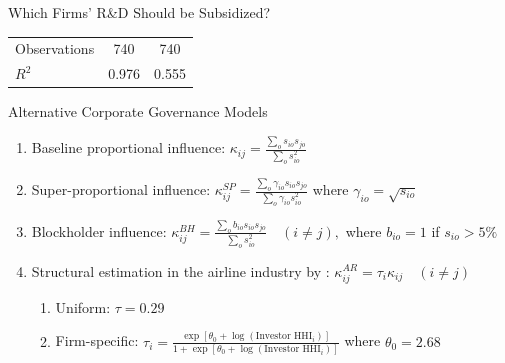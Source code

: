 \documentclass[
  10pt,
  aspectratio=169,   %
]{beamer}
\theoremstyle{plain}
\begin{document}
\begin{frame}{Which Firms' R\&D Should be Subsidized?}
\begin{center}
\begin{tabular}{lcc}
      \hline
      Observations                    & \multicolumn{1}{c}{740}                                            & \multicolumn{1}{c}{740}                                                                     \\
      $R^2$                           & \multicolumn{1}{c}{0.976}                                          & \multicolumn{1}{c}{0.555}                                                                   \\
      \hline\hline
    \end{tabular}
  \end{center}
\end{frame}


\begin{frame}{Alternative Corporate Governance Models}
  \label{corporate_governance}
  \begin{enumerate}
    \item Baseline proportional influence: $\kappa_{ij}=\frac{\sum_{o} s_{io}s_{jo}}{\sum_{o}s_{io}^2}$ \medskip{}
    \item Super-proportional influence: $\kappa^{SP}_{ij}=\frac{\sum_{o}\gamma_{io}s_{io}s_{jo}}{\sum_{o}\gamma_{io}s_{io}^2}$ where $\gamma_{io}=\sqrt{s_{io}}$
          \medskip{}\pause
    \item Blockholder influence: $\kappa^{BH}_{ij}=\frac{\sum_{o}b_{io}s_{io}s_{jo}}{\sum_{o}s_{io}^2}\quad(i\neq j),$ where $b_{io}=1$ if $s_{io}>5\%$
          \medskip{}\pause
    \item Structural estimation in the airline industry by \citet{Azar2021-mb}: $\kappa^{AR}_{ij} = \tau_{i}\kappa_{ij}\quad(i\neq j)$ 
    \begin{enumerate}
      \item Uniform: $\tau = 0.29$
      \item Firm-specific: $\tau_{i}=\frac{\exp\left[\theta_{0}+\log\left(\text{Investor HHI}_{i}\right)\right]}{1+\exp\left[\theta_{0}+\log\left(\text{Investor HHI}_{i}\right)\right]}$ where $\theta_{0}=2.68$
    \end{enumerate}
  \end{enumerate}
\end{frame}
\end{document}
